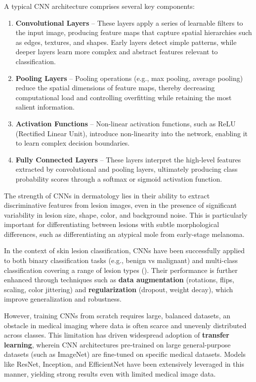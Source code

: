 \documentclass[
  12pt,
  oneside]{article}
\begin{document}
A typical CNN architecture comprises several key components:

\begin{enumerate}
\def\labelenumi{\arabic{enumi}.}
\item
  \textbf{Convolutional Layers} -- These layers apply a series of
  learnable filters to the input image, producing feature maps that
  capture spatial hierarchies such as edges, textures, and shapes. Early
  layers detect simple patterns, while deeper layers learn more complex
  and abstract features relevant to classification.
\item
  \textbf{Pooling Layers} -- Pooling operations (e.g., max pooling,
  average pooling) reduce the spatial dimensions of feature maps,
  thereby decreasing computational load and controlling overfitting
  while retaining the most salient information.
\item
  \textbf{Activation Functions} -- Non-linear activation functions, such
  as ReLU (Rectified Linear Unit), introduce non-linearity into the
  network, enabling it to learn complex decision boundaries.
\item
  \textbf{Fully Connected Layers} -- These layers interpret the
  high-level features extracted by convolutional and pooling layers,
  ultimately producing class probability scores through a softmax or
  sigmoid activation function.
\end{enumerate}

The strength of CNNs in dermatology lies in their ability to extract
discriminative features from lesion images, even in the presence of
significant variability in lesion size, shape, color, and background
noise. This is particularly important for differentiating between
lesions with subtle morphological differences, such as differentiating
an atypical mole from early-stage melanoma.

In the context of skin lesion classification, CNNs have been
successfully applied to both binary classification tasks (e.g., benign
vs malignant) and multi-class classification covering a range of lesion
types (). Their
performance is further enhanced through techniques such as \textbf{data
augmentation} (rotations, flips, scaling, color jittering) and
\textbf{regularization} (dropout, weight decay), which improve
generalization and robustness.

However, training CNNs from scratch requires large, balanced datasets,
an obstacle in medical imaging where data is often scarce and unevenly
distributed across classes. This limitation has driven widespread
adoption of \textbf{transfer learning}, wherein CNN architectures
pre-trained on large general-purpose datasets (such as ImageNet) are
fine-tuned on specific medical datasets. Models like ResNet, Inception,
and EfficientNet have been extensively leveraged in this manner,
yielding strong results even with limited medical image data.
\end{document}
